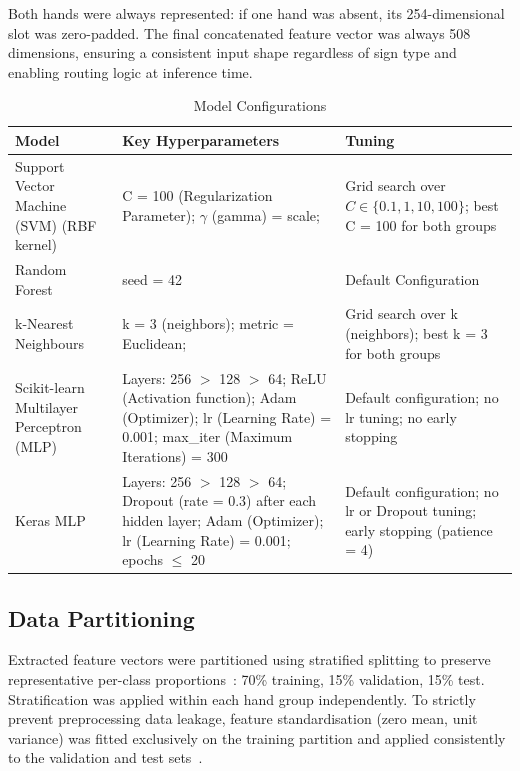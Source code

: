 \documentclass[conference]{IEEEtran}
\begin{document}
Both hands were always represented: if one hand was absent, its 254-dimensional slot was zero-padded. The final concatenated feature vector was always 508 dimensions, ensuring a consistent input shape regardless of sign type and enabling routing logic at inference time.

\begin{table}[t]
  \caption{Model Configurations}
  \label{tab:models}
  \centering
  \begin{tabular}{>{\raggedright\arraybackslash}p{2.2cm} >{\raggedright\arraybackslash}p{7cm} >{\raggedright\arraybackslash}p{6cm}}
    \toprule
    \textbf{Model} & \textbf{Key Hyperparameters} & \textbf{Tuning} \\
    \midrule
    Support Vector Machine (SVM) (RBF kernel) &
      C = 100 (Regularization Parameter); $\gamma$ (gamma) = scale; &
      Grid search over $C \in \{0.1, 1, 10, 100\}$; best C = 100 for both groups \\
    \addlinespace
    Random Forest &
      seed = 42 &
      Default Configuration \\
    \addlinespace
    k-Nearest Neighbours &
      k = 3 (neighbors); metric = Euclidean; &
      Grid search over k (neighbors); best k = 3 for both groups \\
    \addlinespace
    Scikit-learn Multilayer Perceptron (MLP) &
      Layers: 256 $>$ 128 $>$ 64; ReLU (Activation function); Adam (Optimizer); lr (Learning Rate) = 0.001; max\_iter (Maximum Iterations) = 300 &
      Default configuration; no lr tuning; no early stopping \\
    \addlinespace
    Keras MLP &
      Layers: 256 $>$ 128 $>$ 64; Dropout (rate = 0.3) after each hidden layer; Adam (Optimizer); lr (Learning Rate) = 0.001; epochs $\leq$ 20 &
      Default configuration; no lr or Dropout tuning; early stopping (patience = 4) \\
    \bottomrule
  \end{tabular}
\end{table}

\subsection{Data Partitioning}

Extracted feature vectors were partitioned using stratified splitting to preserve representative per-class proportions~: 70\% training, 15\% validation, 15\% test. Stratification was applied within each hand group independently. To strictly prevent preprocessing data leakage, feature standardisation (zero mean, unit variance) was fitted exclusively on the training partition and applied consistently to the validation and test sets~\cite{alhammad2026}.
\end{document}
